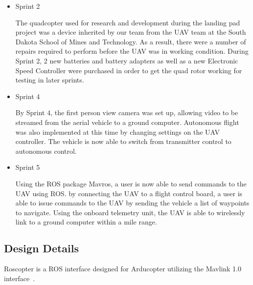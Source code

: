 \begin{itemize}
\item Sprint 2 

The quadcopter used for research and development during the landing pad project was a device inherited by our team from the UAV team at the South Dakota School of Mines and Technology. As a result, there were a number of repairs required to perform before the UAV was in working condition. During Sprint 2, 2 new batteries and battery adapters as well as a new Electronic Speed Controller were purchased in order to get the quad rotor working for testing in later sprints.

\item Sprint 4

By Sprint 4, the first person view camera was set up, allowing video to be streamed from the aerial vehicle to a ground computer. Autonomous flight was also implemented at this time by changing settings on the UAV controller. The vehicle is now able to switch from transmitter control to autonomous control.

\item Sprint 5

Using the ROS package Mavros, a user is now able to send commands to the UAV using ROS. by connecting the UAV to a flight control board, a user is able to issue commands to the UAV by sending the vehicle a list of waypoints to navigate. Using the onboard telemetry unit, the UAV is able to wirelessly link to a ground computer within a mile range.
\end{itemize}

%
%


\subsection{Design Details}
Roscopter is a ROS interface designed for Arducopter utilizing the Mavlink 1.0 interface~\cite{roscopter}.

